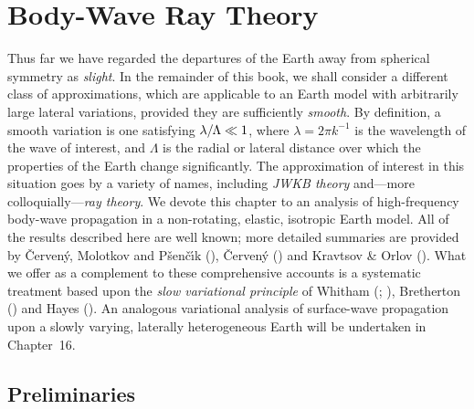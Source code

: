 \chapter{Body-Wave Ray Theory}
%
%

Thus far we have regarded the departures of the Earth away from
spherical symmetry as {\em slight\/}.  In the remainder of this book,
we shall consider a different class of approximations, which are applicable
to an Earth model with arbitrarily large lateral variations, provided
%
%
they are sufficiently {\em smooth\/}.  By definition, a smooth variation
is one satisfying $\lambda/\hspace{-0.3 mm}\Lambda\ll 1$,
where $\lambda=2\pi k^{-1}$ is the
wavelength of the wave of interest, and $\Lambda$ is the radial or lateral
distance over which the properties of the Earth change significantly.
The approximation of interest in this situation goes by a variety of names,
including {\em JWKB theory\/}
%
and---more colloquially---{\em ray theory\/}.
We devote this chapter to an analysis of high-frequency body-wave
propagation in a non-rotating, elastic, isotropic Earth model.  All of the
results described here are well known; more detailed summaries are
provided by \v{C}erven\'{y}, Molotkov and P\v{s}en\v{c}\'{\i}k
(\citeyear{cerveny&al77}), \v{C}erven\'{y} (\citeyear{cerveny85})
and Kravtsov \& Orlov (\citeyear{kravtsov&orlov90}).
What we offer as a complement to these comprehensive
accounts is a systematic treatment based upon the
{\em slow variational principle\/}
%
%
of Whitham (\citeyear{whitham65};
\citeyear{whitham74}), Bretherton (\citeyear{bretherton68})
and Hayes (\citeyear{hayes73}).  An analogous variational
analysis of surface-wave propagation upon a slowly varying,
laterally heterogeneous Earth will be undertaken in Chapter~16.

\section{Preliminaries}

